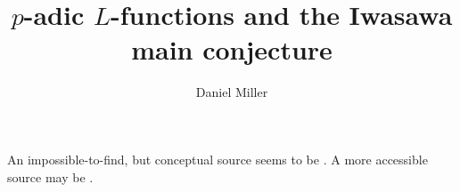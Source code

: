 \documentclass{article}
\title{$p$-adic $L$-functions and the Iwasawa main conjecture}
\author{Daniel Miller}
\begin{document}
\maketitle





An impossible-to-find, but conceptual source seems to be \cite{fk06}. A more 
accessible source may be \cite{pr00}. 







\end{document}
